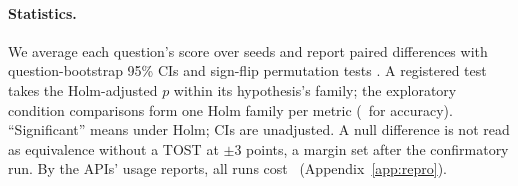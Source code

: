 \paragraph{Statistics.}
We average each question's score over seeds and report paired differences with question-bootstrap 95\% CIs and
sign-flip permutation tests \citep{efron1993bootstrap,dror2018hitchhiker}. A registered test takes the Holm-adjusted
$p$ \citep{holm1979simple} within its hypothesis's family; the exploratory condition comparisons form one Holm family
per metric (\nExploratory\ for accuracy). ``Significant'' means under Holm; CIs are unadjusted. A null difference is not read as equivalence
without a TOST \citep{lakens2017equivalence} at $\pm$3 points, a margin set after the confirmatory run. By the APIs'
usage reports, all runs cost \totalSpend\ (Appendix~\ref{app:repro}).
